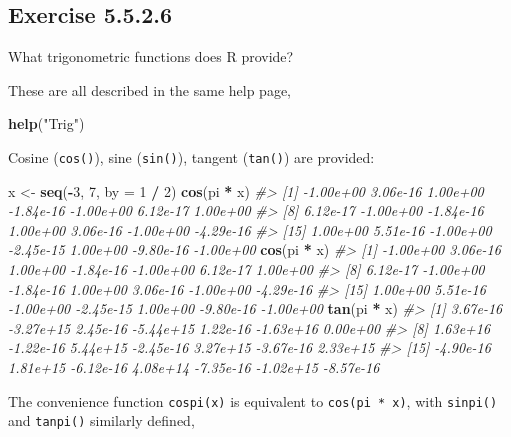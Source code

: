 \documentclass[]{book}
\newenvironment{Shaded}{\begin{snugshade}}{\end{snugshade}}
\newcommand{\CommentTok}[1]{\textcolor[rgb]{0.56,0.35,0.01}{\textit{#1}}}
\newcommand{\DataTypeTok}[1]{\textcolor[rgb]{0.13,0.29,0.53}{#1}}
\newcommand{\DecValTok}[1]{\textcolor[rgb]{0.00,0.00,0.81}{#1}}
\newcommand{\KeywordTok}[1]{\textcolor[rgb]{0.13,0.29,0.53}{\textbf{#1}}}
\newcommand{\NormalTok}[1]{#1}
\newcommand{\OperatorTok}[1]{\textcolor[rgb]{0.81,0.36,0.00}{\textbf{#1}}}
\newcommand{\StringTok}[1]{\textcolor[rgb]{0.31,0.60,0.02}{#1}}
\theoremstyle{plain}
\theoremstyle{remark}
\begin{document}
\hypertarget{exercise-5.5.2.6}{%
\subsection*{\texorpdfstring{Exercise
{5.5.2.6}}{Exercise 5.5.2.6}}\label{exercise-5.5.2.6}}

What trigonometric functions does R provide?

These are all described in the same help page,

\begin{Shaded}
\begin{Highlighting}[]
\KeywordTok{help}\NormalTok{(}\StringTok{"Trig"}\NormalTok{)}
\end{Highlighting}
\end{Shaded}

Cosine (\texttt{cos()}), sine (\texttt{sin()}), tangent (\texttt{tan()})
are provided:

\begin{Shaded}
\begin{Highlighting}[]
\NormalTok{x <-}\StringTok{ }\KeywordTok{seq}\NormalTok{(}\OperatorTok{-}\DecValTok{3}\NormalTok{, }\DecValTok{7}\NormalTok{, }\DataTypeTok{by =} \DecValTok{1} \OperatorTok{/}\StringTok{ }\DecValTok{2}\NormalTok{)}
\KeywordTok{cos}\NormalTok{(pi }\OperatorTok{*}\StringTok{ }\NormalTok{x)}
\CommentTok{#>  [1] -1.00e+00  3.06e-16  1.00e+00 -1.84e-16 -1.00e+00  6.12e-17  1.00e+00}
\CommentTok{#>  [8]  6.12e-17 -1.00e+00 -1.84e-16  1.00e+00  3.06e-16 -1.00e+00 -4.29e-16}
\CommentTok{#> [15]  1.00e+00  5.51e-16 -1.00e+00 -2.45e-15  1.00e+00 -9.80e-16 -1.00e+00}
\KeywordTok{cos}\NormalTok{(pi }\OperatorTok{*}\StringTok{ }\NormalTok{x)}
\CommentTok{#>  [1] -1.00e+00  3.06e-16  1.00e+00 -1.84e-16 -1.00e+00  6.12e-17  1.00e+00}
\CommentTok{#>  [8]  6.12e-17 -1.00e+00 -1.84e-16  1.00e+00  3.06e-16 -1.00e+00 -4.29e-16}
\CommentTok{#> [15]  1.00e+00  5.51e-16 -1.00e+00 -2.45e-15  1.00e+00 -9.80e-16 -1.00e+00}
\KeywordTok{tan}\NormalTok{(pi }\OperatorTok{*}\StringTok{ }\NormalTok{x)}
\CommentTok{#>  [1]  3.67e-16 -3.27e+15  2.45e-16 -5.44e+15  1.22e-16 -1.63e+16  0.00e+00}
\CommentTok{#>  [8]  1.63e+16 -1.22e-16  5.44e+15 -2.45e-16  3.27e+15 -3.67e-16  2.33e+15}
\CommentTok{#> [15] -4.90e-16  1.81e+15 -6.12e-16  4.08e+14 -7.35e-16 -1.02e+15 -8.57e-16}
\end{Highlighting}
\end{Shaded}

The convenience function \texttt{cospi(x)} is equivalent to
\texttt{cos(pi\ *\ x)}, with \texttt{sinpi()} and \texttt{tanpi()}
similarly defined,
\end{document}
